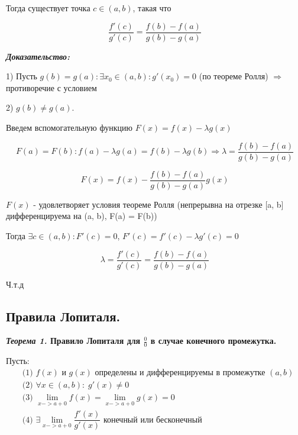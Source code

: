 \documentclass[a4paper,12pt]{article}
\theoremstyle{plain} %
\theoremstyle{definition} %
\theoremstyle{remark} %
\begin{document}
Тогда существует точка $c \in (a, b)$, такая что

\[
	\frac{f'(c)}{g'(c)} = \frac{f(b) - f(a)}{g(b) - g(a)}
\]

\textit{\textbf{Доказательство:}}

1) Пусть $g(b) = g(a): \exists x_0 \in (a, b): g'(x_0) = 0$ (по теореме Ролля) $\Rightarrow$ противоречие с условием

2) $g(b) \neq g(a)$.

Введем вспомогательную функцию $F(x) = f(x) - \lambda g(x)$

\[
	F(a) = F(b): f(a) - \lambda g(a) = f(b) - \lambda g(b) \Rightarrow \lambda  = \frac{f(b) - f(a)}{g(b) - g(a)}
\]

\[
	F(x) = f(x) - \frac{f(b) - f(a)}{g(b) - g(a)}g(x)
\]

$F(x)$ - удовлетворяет условия теореме Ролля (непрерывна на отрезке [a, b] дифференцируема на (a, b), F(a) = F(b))

Тогда $\exists c \in (a, b): F'(c) = 0$, $F'(c) = f'(c) - \lambda g'(c) = 0$

\[
	\lambda = \frac{f'(c)}{g'(c)} = \frac{f(b) - f(a)}{g(b) - g(a)}
\]

Ч.т.д


\newpage
\subsection*{Правила Лопиталя.                                                                          }

\textbf{\textit{Теорема 1.} Правило Лопиталя для $\frac{0}{0}$ в случае конечного промежутка.}

Пусть:
\begin{equation*}
	\begin{aligned}
		 & \text{(1) } f(x) \text{ и } g(x) \text{ определены и дифференцируемы в промежутке }(a, b)    \\
		 & \text{(2) } \forall x \in (a, b): \; g'(x) \neq 0                                            \\
		 & \text{(3) }  \lim_{x-> a + 0} f(x) =  \lim_{x-> a + 0} g(x) = 0                              \\
		 & \text{(4) }  \exists \lim_{x-> a + 0} \dfrac{f'(x)}{g'(x)} \text{ конечный или бесконечный } \\
	\end{aligned}
\end{equation*}
\end{document}
